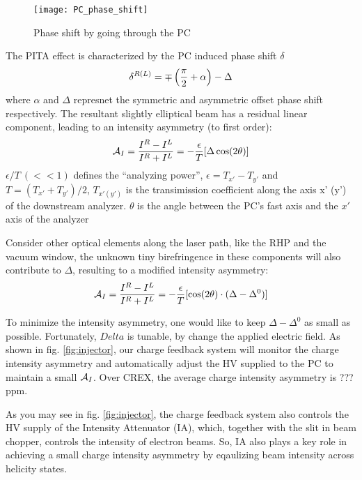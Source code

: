 \begin{figure}[h!]
    \centering
    \texttt{[image: PC\_phase\_shift]}
    \caption{Phase shift by going through the PC}
    \label{fig:pc_phase_shift}
\end{figure}

The PITA effect is characterized by the PC induced phase shift $\delta$
\begin{equation*}
    \delta^{R(L)} = \mp\left(\frac{\pi}{2} + \alpha \right) - \Delta \\
\end{equation*}
where $\alpha$ and $\Delta$ represnet the symmetric and asymmetric offset phase
shift respectively. The resultant slightly elliptical beam has a residual
linear component, leading to an intensity asymmetry (to first order):
\begin{equation}
    \mathcal{A}_{I} = \frac{I^R - I^L}{I^R + I^L} = -\frac{\epsilon}{T}[\Delta\cos(2\theta)]	\\
\end{equation}
$\epsilon/T \ (<<1)$ defines the ``analyzing power'', $\epsilon = T_{x'} - T_{y'}$ 
and $T = (T_{x'} + T_{y'})/2$,
$T_{x' (y')}$ is the transimission coefficient along the axis x' (y') of the
downstream analyzer. $\theta$ is the angle between the PC's fast axis and the 
$x'$ axis of the analyzer

Consider other optical elements along the laser path, like the RHP and the vacuum
window, the unknown tiny birefringence in these components will also contribute to $\Delta$,
resulting to a modified intensity asymmetry:
\begin{equation}
    \mathcal{A}_{I} = \frac{I^R - I^L}{I^R + I^L} = -\frac{\epsilon}{T}[\cos(2\theta)\cdot(\Delta - \Delta^0)]	\\
\end{equation}

To minimize the intensity asymmetry, one would like to keep $\Delta - \Delta^0$
as small as possible. Fortunately, $Delta$ is tunable, by change the applied
electric field. As shown in fig. \ref{fig:injector}, our charge feedback system
will monitor the charge intensity asymmetry and automatically adjust the HV 
supplied to the PC to maintain a small $\mathcal{A}_I$. Over CREX, the average charge
intensity asymmetry is ??? ppm.

As you may see in fig. \ref{fig:injector}, the charge feedback system also
controls the HV supply of the Intensity Attenuator (IA), which, together with
the slit in beam chopper, controls the intensity of electron beams. So, IA also
plays a key role in achieving a small charge intensity asymmetry by eqaulizing
beam intensity across helicity states.

